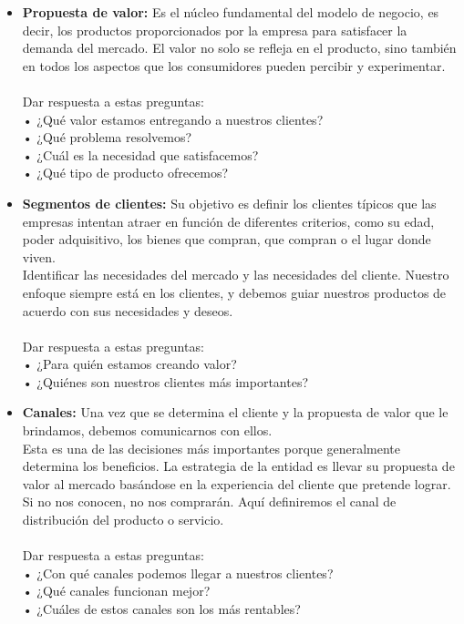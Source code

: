 \documentclass[preprint,12pt]{elsarticle}
\begin{document}
	\begin{itemize}
	\item {\textbf{Propuesta de valor: }} Es el núcleo fundamental del modelo de negocio, es decir, los productos proporcionados por la empresa para satisfacer la demanda del mercado. El valor no solo se refleja en el producto, sino también en todos los aspectos que los consumidores pueden percibir y experimentar. \\\\Dar respuesta a estas preguntas:\\ • ¿Qué valor estamos entregando a nuestros clientes?\\ • ¿Qué problema resolvemos?\\ • ¿Cuál es la necesidad que satisfacemos? \\ • ¿Qué tipo de producto ofrecemos? 

	\item {\textbf{Segmentos de clientes: }} Su objetivo es definir los clientes típicos que las empresas intentan atraer en función de diferentes criterios, como su edad, poder adquisitivo, los bienes que compran, que compran o el lugar donde viven. \\Identificar las necesidades del mercado y las necesidades del cliente. Nuestro enfoque siempre está en los clientes, y debemos guiar nuestros productos de acuerdo con sus necesidades y deseos.\\\\Dar respuesta a estas preguntas:\\ • ¿Para quién estamos creando valor?\\ • ¿Quiénes son nuestros clientes más importantes?

	\item {\textbf{Canales: }} Una vez que se determina el cliente y la propuesta de valor que le brindamos, debemos comunicarnos con ellos. \\ Esta es una de las decisiones más importantes porque generalmente determina los beneficios. La estrategia de la entidad es llevar su propuesta de valor al mercado basándose en la experiencia del cliente que pretende lograr. Si no nos conocen, no nos comprarán. Aquí definiremos el canal de distribución del producto o servicio.\\\\Dar respuesta a estas preguntas:\\ • ¿Con qué canales podemos llegar a nuestros clientes? \\ • ¿Qué canales funcionan mejor? \\ • ¿Cuáles de estos canales son los más rentables?


\end{itemize}
\end{document}
